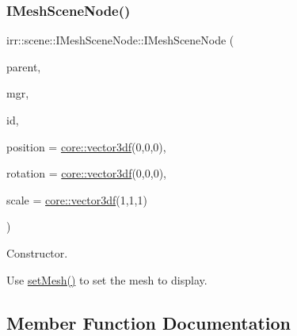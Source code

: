 \subsubsection{\texorpdfstring{I\+Mesh\+Scene\+Node()}{IMeshSceneNode()}}
{\footnotesize\ttfamily irr\+::scene\+::\+I\+Mesh\+Scene\+Node\+::\+I\+Mesh\+Scene\+Node (\begin{DoxyParamCaption}\item[{\hyperlink{classirr_1_1scene_1_1ISceneNode}{I\+Scene\+Node} $\ast$}]{parent,  }\item[{\hyperlink{classirr_1_1scene_1_1ISceneManager}{I\+Scene\+Manager} $\ast$}]{mgr,  }\item[{\hyperlink{namespaceirr_ac66849b7a6ed16e30ebede579f9b47c6}{s32}}]{id,  }\item[{const \hyperlink{namespaceirr_1_1core_a06f169d08b5c429f5575acb7edbad811}{core\+::vector3df} \&}]{position = {\ttfamily \hyperlink{namespaceirr_1_1core_a06f169d08b5c429f5575acb7edbad811}{core\+::vector3df}(0,0,0)},  }\item[{const \hyperlink{namespaceirr_1_1core_a06f169d08b5c429f5575acb7edbad811}{core\+::vector3df} \&}]{rotation = {\ttfamily \hyperlink{namespaceirr_1_1core_a06f169d08b5c429f5575acb7edbad811}{core\+::vector3df}(0,0,0)},  }\item[{const \hyperlink{namespaceirr_1_1core_a06f169d08b5c429f5575acb7edbad811}{core\+::vector3df} \&}]{scale = {\ttfamily \hyperlink{namespaceirr_1_1core_a06f169d08b5c429f5575acb7edbad811}{core\+::vector3df}(1,1,1)} }\end{DoxyParamCaption})\hspace{0.3cm}{\ttfamily [inline]}}



Constructor. 

Use \hyperlink{classirr_1_1scene_1_1IMeshSceneNode_a8d7e98ddfb990bfc354c9c410a4d788f}{set\+Mesh()} to set the mesh to display. 

\subsection{Member Function Documentation}
\mbox{\label{classirr_1_1scene_1_1IMeshSceneNode_ad7cd00b302466dea891c7a0b6b28de19}} 
